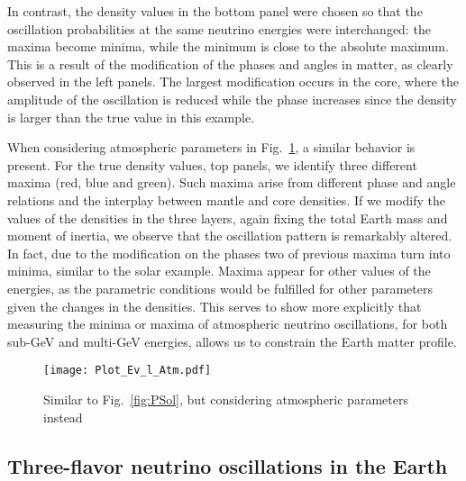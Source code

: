 In contrast, the density values in the bottom panel were chosen so that the oscillation probabilities at the same neutrino energies  were interchanged: the maxima become minima, while the minimum is close to the absolute maximum.
This is a result of the modification of the phases and angles in matter, as clearly observed in the left panels. 
The largest modification occurs in the core, where the amplitude of the oscillation is reduced while the phase increases since the density is larger than the true value in this example.

When considering atmospheric parameters in Fig.~\ref{fig:PAtm}, a similar behavior is present. 
For the true density values, top panels, we identify three different maxima (red, blue and green).
Such maxima arise from different phase and angle relations and the interplay between mantle and core densities. 
If we modify the values of the densities in the three layers, again fixing the total Earth mass and moment of inertia, we observe that the oscillation pattern is remarkably altered. 
In fact, due to the modification on the phases two of previous maxima turn into minima, similar to the solar example. 
Maxima appear for other values of the energies, as the parametric conditions would be fulfilled for other parameters given the changes in the densities. 
This serves to show more explicitly that measuring the minima or maxima of atmospheric neutrino oscillations, for both sub-GeV and multi-GeV energies, allows us to constrain the Earth matter profile.
\begin{figure}
\begin{center}
\texttt{[image: Plot\_Ev\_l\_Atm.pdf]}
\caption{Similar to Fig.~\ref{fig:PSol}, but considering atmospheric parameters instead \label{fig:PAtm}}
\end{center}
\end{figure}

\subsection{Three-flavor neutrino oscillations in the Earth}

